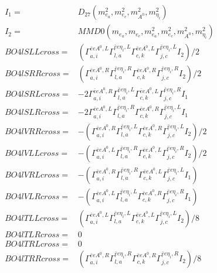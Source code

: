 \documentclass[A4,landscape]{article}
\begin{document}
\begin{align} 
I_1 = & D_{27}(m^2_{e_{{a}}}, m^2_{e_{{c}}}, m^2_{A^0}, m^2_{\eta_i}) \\ 
I_2 = & MMD0(m_{e_{{a}}}, m_{e_{{c}}}, m^2_{e_{{a}}}, m^2_{e_{{c}}}, m^2_{A^0}, m^2_{\eta_i}) \\ 
  BO4lSLLcross= & ( \Gamma^{\bar{e}e A^0 ,L}_{a, i} \Gamma^{\bar{e}e \eta_i ,L}_{l, a} \Gamma^{\bar{e}e A^0 ,L}_{c, k} \Gamma^{\bar{e}e \eta_i ,L}_{j, c} I_2)/2 \\ 
  BO4lSRRcross= & ( \Gamma^{\bar{e}e A^0 ,R}_{a, i} \Gamma^{\bar{e}e \eta_i ,R}_{l, a} \Gamma^{\bar{e}e A^0 ,R}_{c, k} \Gamma^{\bar{e}e \eta_i ,R}_{j, c} I_2)/2 \\ 
  BO4lSRLcross= & -2  \Gamma^{\bar{e}e A^0 ,R}_{a, i} \Gamma^{\bar{e}e \eta_i ,L}_{l, a} \Gamma^{\bar{e}e A^0 ,L}_{c, k} \Gamma^{\bar{e}e \eta_i ,R}_{j, c} I_1 \\ 
  BO4lSLRcross= & -2  \Gamma^{\bar{e}e A^0 ,L}_{a, i} \Gamma^{\bar{e}e \eta_i ,R}_{l, a} \Gamma^{\bar{e}e A^0 ,R}_{c, k} \Gamma^{\bar{e}e \eta_i ,L}_{j, c} I_1 \\ 
  BO4lVRRcross= & -( \Gamma^{\bar{e}e A^0 ,R}_{a, i} \Gamma^{\bar{e}e \eta_i ,L}_{l, a} \Gamma^{\bar{e}e A^0 ,R}_{c, k} \Gamma^{\bar{e}e \eta_i ,L}_{j, c} I_2)/2 \\ 
  BO4lVLLcross= & -( \Gamma^{\bar{e}e A^0 ,L}_{a, i} \Gamma^{\bar{e}e \eta_i ,R}_{l, a} \Gamma^{\bar{e}e A^0 ,L}_{c, k} \Gamma^{\bar{e}e \eta_i ,R}_{j, c} I_2)/2 \\ 
  BO4lVRLcross= & -( \Gamma^{\bar{e}e A^0 ,R}_{a, i} \Gamma^{\bar{e}e \eta_i ,R}_{l, a} \Gamma^{\bar{e}e A^0 ,L}_{c, k} \Gamma^{\bar{e}e \eta_i ,L}_{j, c} I_1) \\ 
  BO4lVLRcross= & -( \Gamma^{\bar{e}e A^0 ,L}_{a, i} \Gamma^{\bar{e}e \eta_i ,L}_{l, a} \Gamma^{\bar{e}e A^0 ,R}_{c, k} \Gamma^{\bar{e}e \eta_i ,R}_{j, c} I_1) \\ 
  BO4lTLLcross= & ( \Gamma^{\bar{e}e A^0 ,L}_{a, i} \Gamma^{\bar{e}e \eta_i ,L}_{l, a} \Gamma^{\bar{e}e A^0 ,L}_{c, k} \Gamma^{\bar{e}e \eta_i ,L}_{j, c} I_2)/8 \\ 
  BO4lTLRcross= & 0 \\ 
  BO4lTRLcross= & 0 \\ 
  BO4lTRRcross= & ( \Gamma^{\bar{e}e A^0 ,R}_{a, i} \Gamma^{\bar{e}e \eta_i ,R}_{l, a} \Gamma^{\bar{e}e A^0 ,R}_{c, k} \Gamma^{\bar{e}e \eta_i ,R}_{j, c} I_2)/8 \\ 
\end{align} 
\end{document}
